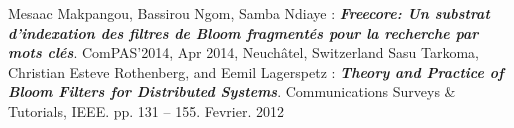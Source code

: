 \begin{thebibliography}{2}
		Mesaac Makpangou, Bassirou Ngom, Samba Ndiaye : 
		\textbf{\textit{Freecore: Un substrat d'indexation des filtres de Bloom fragmentés pour la recherche par mots clés}}.
		ComPAS'2014, Apr 2014, Neuchâtel, Switzerland
   		Sasu Tarkoma, Christian Esteve Rothenberg, and Eemil Lagerspetz :
  		 \textbf{\textit{Theory and Practice of Bloom Filters for Distributed Systems}}.
		Communications Surveys \& Tutorials, IEEE. pp. 131 – 155. Fevrier. 2012
\end{thebibliography}
